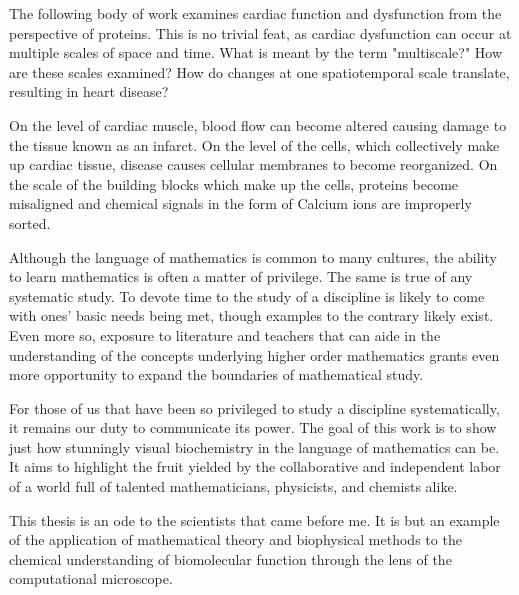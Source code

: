 \documentclass[12pt]{ucsddissertation}
\begin{document}
\begin{dissertationintroduction}

The following body of work examines cardiac function and dysfunction from the  perspective of proteins. This is no trivial feat, as cardiac dysfunction can occur at multiple scales of space and time. What is meant by the term "multiscale?" How are these scales examined? How do changes at one spatiotemporal scale translate, resulting in heart disease? 

 On the level of cardiac muscle, blood flow can become altered causing damage to the tissue known as an infarct. On the level of the cells, which collectively make up cardiac tissue, disease causes cellular membranes to become reorganized. On the scale of the building blocks which make up the cells, proteins become misaligned and chemical signals in the form of Calcium ions are improperly sorted. 
 
 
\end{dissertationintroduction}



Although the language of mathematics is common to many cultures, the ability to learn mathematics is often a matter of privilege. The same is true of any systematic study. To devote time to the study of a discipline is likely to come with ones' basic needs being met, though examples to the contrary likely exist. Even more so, exposure to literature and teachers that can aide in the understanding of the concepts underlying higher order mathematics grants even more opportunity to expand the boundaries of mathematical study.

For those of us that have been so privileged to study a discipline systematically, it remains our duty to communicate its power. The goal of this work is to show just how stunningly visual biochemistry in the language of mathematics can be. It aims to highlight the fruit yielded by the collaborative and independent labor of a world full of talented mathematicians, physicists, and chemists alike. 

This thesis is an ode to the scientists that came before me. It is but an example of the application of mathematical theory and biophysical methods to the chemical understanding of biomolecular function through the lens of the computational microscope. 
\end{document}
